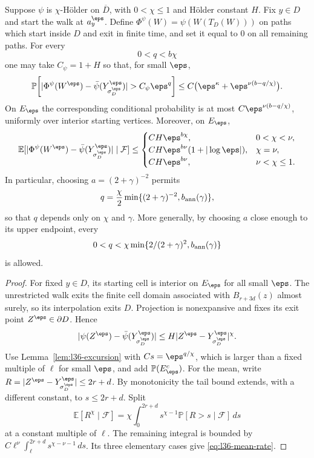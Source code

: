 \begin{theorem}\label{thm:l36-rate}
Suppose $\psi$ is $\chi$-H\"older on $\overline D$, with
$0<\chi\le1$ and H\"older constant $H$.
Fix $y\in D$ and start the walk at $a_y^\eps$.
Define $\Phi^\psi(W)=\psi(W(T_D(W)))$ on paths which start
inside $D$ and exit in finite time, and set it equal to $0$
on all remaining paths. For every
\[
                         0<q<b\chi
\]
one may take $C_\psi=1+H$ so that, for small $\eps$,
\begin{equation}\label{eq:l36-rate}
 \mathbb{P}\!\left[
 |\Phi^\psi(W^\eps)-\bar\psi(Y^\eps_{\sigma_D^\eps})|
       >C_\psi\eps^q\right]
 \le C\bigl(\eps^\kappa+\eps^{\nu(b-q/\chi)}\bigr).
\end{equation}
On $E_\eps$ the corresponding conditional probability is at
most $C\eps^{\nu(b-q/\chi)}$, uniformly over interior starting
vertices. Moreover, on $E_\eps$,
\begin{equation}\label{eq:l36-mean-rate}
 \mathbb{E}[|\Phi^\psi(W^\eps)-\bar\psi(Y^\eps_{\sigma_D^\eps})|
       \mid\mathcal F]\le
 \begin{cases}
 C H\eps^{b\chi},&0<\chi<\nu,\\
 C H\eps^{b\nu}(1+|\log\eps|),&\chi=\nu,\\
 C H\eps^{b\nu},&\nu<\chi\le1 .
 \end{cases}
\end{equation}
In particular, choosing $a=(2+\gamma)^{-2}$ permits
\[
 q=\frac{\chi}{2}\min\{(2+\gamma)^{-2},b_{\rm ann}(\gamma)\},
\]
so that $q$ depends only on $\chi$ and $\gamma$.
More generally, by choosing $a$ close enough to its upper
endpoint, every
\begin{equation}\label{eq:l36-full-q-range}
 0<q<\chi\min\{2/(2+\gamma)^2,b_{\rm ann}(\gamma)\}
\end{equation}
is allowed.
\end{theorem}
\begin{proof}
For fixed $y\in D$, its starting cell is interior on $E_\eps$
for all small $\eps$.
The unrestricted walk exits the finite cell domain associated
with $B_{r+3d}(z)$ almost surely, so its interpolation exits $D$.
Projection is nonexpansive and fixes its exit point
$Z^\eps\in\partial D$. Hence
\[
 |\psi(Z^\eps)-\bar\psi(Y^\eps_{\sigma_D^\eps})|
 \le H|Z^\eps-Y^\eps_{\sigma_D^\eps}|^\chi.
\]
Use Lemma~\ref{lem:l36-excursion} with $Cs=\eps^{q/\chi}$,
which is larger than a fixed multiple of $\ell$ for small
$\eps$, and add $\mathbb{P}(E_\eps^c)$.
For the mean, write $R=|Z^\eps-Y^\eps_{\sigma_D^\eps}|
\le2r+d$. By monotonicity the tail bound extends, with a
different constant, to $s\le2r+d$.
Split
\[
 \mathbb{E}[R^\chi\mid\mathcal F]
 =\chi\int_0^{2r+d}s^{\chi-1}\mathbb{P}[R>s\mid\mathcal F]\,ds
\]
at a constant multiple of $\ell$.
The remaining integral is bounded by
$C\ell^\nu\int_\ell^{2r+d}s^{\chi-\nu-1}\,ds$.
Its three elementary cases give \eqref{eq:l36-mean-rate}.
\end{proof}
